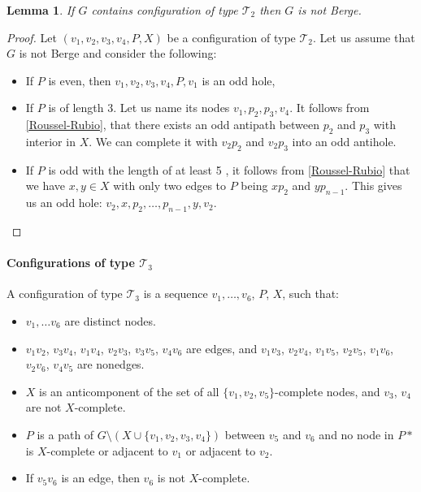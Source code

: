 \documentclass{article}
\newtheorem{lemma}[theorem]{Lemma}
\newcommand\T{\mathcal{T}}
\begin{document}
\begin{lemma}
	If $G$ contains configuration of type $\T_2$ then $G$ is not Berge.
\end{lemma}
\begin{proof}
	Let $(v_1, v_2, v_3, v_4, P, X)$ be a configuration of type $\T_2$. Let us assume that $G$ is not Berge and consider the following:
	\begin{itemize}
		\item If $P$ is even, then $v_1, v_2, v_3, v_4, P, v_1$ is an odd hole,
		\item If $P$ is of length 3.  Let us name its nodes $v_1, p_2, p_3, v_4$. It follows from \cref{Roussel-Rubio}, that there exists an odd antipath between $p_2$ and $p_3$ with interior in $X$. We can complete it with $v_2p_2$ and $v_2p_3$ into an odd antihole.
		\item If $P$ is odd with the length of at least 5 , it follows from \cref{Roussel-Rubio} that we have $x, y \in X$ with only two edges to $P$ being $xp_2$ and $yp_{n-1}$. This gives us an odd hole: $v_2, x, p_2, \ldots, p_{n-1}, y, v_2$.
	\end{itemize} 
\end{proof}

\paragraph{Configurations of type $\T_3$}

A configuration of type $\T_3$ is a sequence $v_1, \ldots, v_6$, $P$, $X$, such that:
\begin{itemize}
	\item $v_1, \ldots v_6$ are distinct nodes.
	\item $v_1v_2$, $v_3v_4$, $v_1v_4$, $v_2v_3$, $v_3v_5$, $v_4v_6$ are edges, and $v_1v_3$, $v_2v_4$, $v_1v_5$, $v_2v_5$, $v_1v_6$, $v_2v_6$, $v_4v_5$ are nonedges.
	\item $X$ is an anticomponent of the set of all $\{v_1, v_2, v_5\}$-complete nodes, and $v_3$, $v_4$ are not $X$-complete.
	\item $P$ is a path of $G \setminus ( X \cup \{v_1, v_2, v_3, v_4\} )$ between $v_5$ and $v_6$ and no node in $P*$ is $X$-complete or adjacent to $v_1$ or adjacent to $v_2$.
	\item If $v_5v_6$ is an edge, then $v_6$ is not $X$-complete.
\end{itemize}
\end{document}
